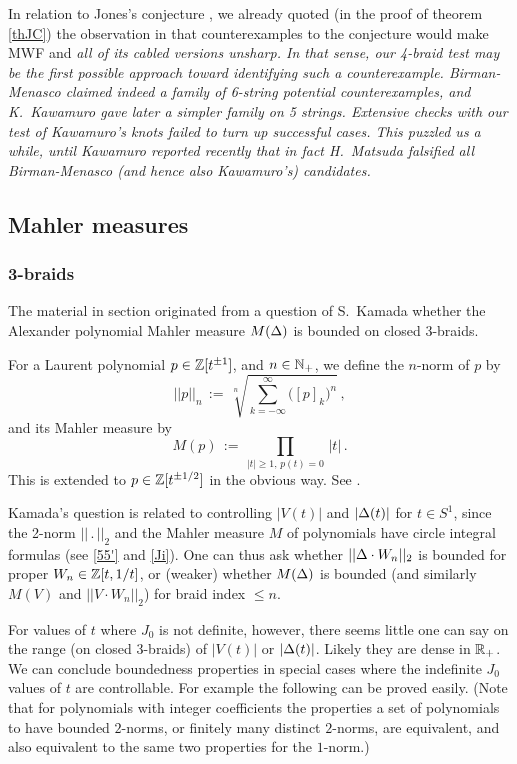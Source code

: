 \begin{rem}\label{rJC}
In relation to Jones's conjecture , we
already quoted (in the proof of theorem \ref{thJC})
the observation in \cite{posex_bcr} that counterexamples
to the conjecture would make MWF and \em{all} of its cabled
versions unsharp. In that sense, our 4-braid test may be
the first possible approach toward identifying such a
counterexample. Birman-Menasco claimed indeed a family
of 6-string potential counterexamples, and K.~Kawamuro
gave later a simpler family on 5 strings. Extensive
checks with our test of Kawamuro's knots failed to turn up
successful cases. This puzzled us a while, until Kawamuro
reported recently that in fact H.~Matsuda falsified all
Birman-Menasco (and hence also Kawamuro's) candidates.
\end{rem}

\subsection{Mahler measures}

\subsubsection{3-braids}

The material in section  originated from
a question of S.~Kamada whether the Alexander polynomial
Mahler measure $M(\Delta)$ is bounded on closed 3-braids. 

\begin{defi}
For a Laurent polynomial $p\in{\Bbb Z}[t^{\pm 1}]$, and $n\in{\Bbb N}_+$,
we define the $n$-norm of $p$ by
\[
||p||_n\,:=\,\sqrt[n]{\sum_{k=-\infty}^{\infty}\bigl([p]_k\bigr)^n}\,,
\]
and its Mahler measure by
\[
M(p)\,:=\,\prod_{|t|\ge 1,\,p(t)=0}\,|t|\,.
\]
This is extended to $p\in{\Bbb Z}[t^{\pm 1/2}]$ in the obvious way.
See \cite{SSW,CK}.
\end{defi}

Kamada's question is related to controlling $|V(t)|$ and $|\Delta(t)|$
for $t\in S^1$, since the 2-norm $||\,.\,||_2$ and the Mahler
measure $M$ of polynomials have circle integral formulas (see
\eqref{55'} and \eqref{Ji}). One
can thus ask whether $||\Delta\cdot W_n||_2$ is bounded for proper
$W_n\in {\Bbb Z}[t,1/t]$, or (weaker) whether $M(\Delta)$ is bounded
(and similarly $M(V)$ and $||V\cdot W_n||_2$) for braid
index $\le n$.

For values of $t$ where $J_0$ is not definite, however, there
seems little one can say on the range (on closed 3-braids)
of $|V(t)|$ or $|\Delta(t)|$. Likely they are dense in ${\Bbb R}_+$.
We can conclude boundedness properties in
special cases where the indefinite $J_0$ values of $t$ are
controllable. For example the following can be proved easily.
(Note that for polynomials with integer coefficients the properties
a set of polynomials to have bounded $2$-norms, or finitely many
distinct $2$-norms, are equivalent, and also equivalent to the same
two properties for the $1$-norm.)

